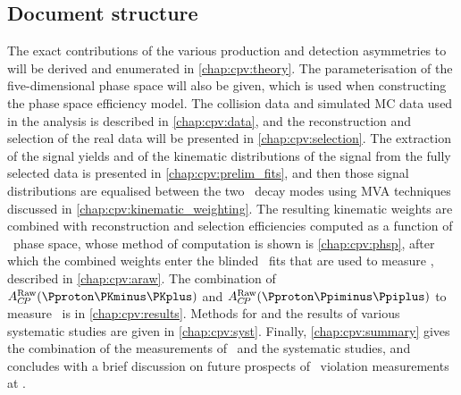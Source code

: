 \subsection{Document structure}
\label{chap:cpv:introduction:overview:structure}

The exact contributions of the various production and detection asymmetries to 
\ARaw will be derived and enumerated in \cref{chap:cpv:theory}.
The parameterisation of the five-dimensional phase space will also be given, 
which is used when constructing the phase space efficiency model.
The collision data and simulated \ac{MC} data used in the analysis is described 
in \cref{chap:cpv:data}, and the reconstruction and selection of the real data 
will be presented in \cref{chap:cpv:selection}.
The extraction of the signal yields and of the kinematic distributions of the 
signal from the fully selected data is presented in 
\cref{chap:cpv:prelim_fits}, and then those signal distributions are equalised 
between the two \PLambdac\ decay modes using \ac{MVA} techniques discussed in 
\cref{chap:cpv:kinematic_weighting}.
The resulting kinematic weights are combined with reconstruction and selection 
efficiencies computed as a function of \phh\ phase space, whose method of 
computation is shown is \cref{chap:cpv:phsp}, after which the combined weights 
enter the blinded \chisq\ fits that are used to measure \ARaw, described in 
\cref{chap:cpv:araw}.
The combination of $\ARaw(\pKK)$ and $\ARaw(\ppipi)$ to measure \dACP\ is in 
\cref{chap:cpv:results}.
Methods for and the results of various systematic studies are given in 
\cref{chap:cpv:syst}.
Finally, \cref{chap:cpv:summary} gives the combination of the measurements of 
\dACP\ and the systematic studies, and concludes with a brief discussion on 
future prospects of \CP\ violation measurements at \lhcb.

